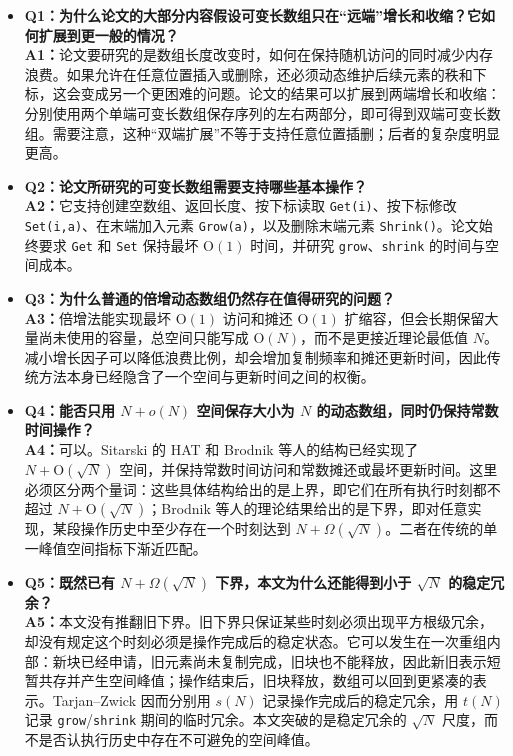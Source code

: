 \documentclass[UTF8,11pt,a4paper]{ctexart}
\newcommand{\op}[1]{\textnormal{\texttt{#1}}}
\newcommand{\Oh}{\mathrm{O}}
\begin{document}
\begin{itemize}[label={},leftmargin=0pt,itemsep=1.0em,topsep=0.5em]

  \item \textbf{Q1：为什么论文的大部分内容假设可变长数组只在“远端”增长和收缩？它如何扩展到更一般的情况？}
  \\
  \textbf{A1：}论文要研究的是数组长度改变时，如何在保持随机访问的同时减少内存浪费。如果允许在任意位置插入或删除，还必须动态维护后续元素的秩和下标，这会变成另一个更困难的问题。论文的结果可以扩展到两端增长和收缩：分别使用两个单端可变长数组保存序列的左右两部分，即可得到双端可变长数组。需要注意，这种“双端扩展”不等于支持任意位置插删；后者的复杂度明显更高。

  \item \textbf{Q2：论文所研究的可变长数组需要支持哪些基本操作？}
  \\
  \textbf{A2：}它支持创建空数组、返回长度、按下标读取 \op{Get(i)}、按下标修改 \op{Set(i,a)}、在末端加入元素 \op{Grow(a)}，以及删除末端元素 \op{Shrink()}。论文始终要求 \op{Get} 和 \op{Set} 保持最坏 $\Oh(1)$ 时间，并研究 \op{grow}、\op{shrink} 的时间与空间成本。

  \item \textbf{Q3：为什么普通的倍增动态数组仍然存在值得研究的问题？}
  \\
  \textbf{A3：}倍增法能实现最坏 $\Oh(1)$ 访问和摊还 $\Oh(1)$ 扩缩容，但会长期保留大量尚未使用的容量，总空间只能写成 $\Oh(N)$，而不是更接近理论最低值 $N$。减小增长因子可以降低浪费比例，却会增加复制频率和摊还更新时间，因此传统方法本身已经隐含了一个空间与更新时间之间的权衡。

  \item \textbf{Q4：能否只用 $N+o(N)$ 空间保存大小为 $N$ 的动态数组，同时仍保持常数时间操作？}
  \\
  \textbf{A4：}可以。Sitarski 的 HAT 和 Brodnik 等人的结构已经实现了 $N+\Oh(\sqrt{N})$ 空间，并保持常数时间访问和常数摊还或最坏更新时间。这里必须区分两个量词：这些具体结构给出的是上界，即它们在所有执行时刻都不超过 $N+\Oh(\sqrt{N})$；Brodnik 等人的理论结果给出的是下界，即对任意实现，某段操作历史中至少存在一个时刻达到 $N+\Omega(\sqrt{N})$。二者在传统的单一峰值空间指标下渐近匹配。

  \item \textbf{Q5：既然已有 $N+\Omega(\sqrt{N})$ 下界，本文为什么还能得到小于 $\sqrt{N}$ 的稳定冗余？}
  \\
  \textbf{A5：}本文没有推翻旧下界。旧下界只保证某些时刻必须出现平方根级冗余，却没有规定这个时刻必须是操作完成后的稳定状态。它可以发生在一次重组内部：新块已经申请，旧元素尚未复制完成，旧块也不能释放，因此新旧表示短暂共存并产生空间峰值；操作结束后，旧块释放，数组可以回到更紧凑的表示。Tarjan--Zwick 因而分别用 $s(N)$ 记录操作完成后的稳定冗余，用 $t(N)$ 记录 \op{grow}/\op{shrink} 期间的临时冗余。本文突破的是稳定冗余的 $\sqrt{N}$ 尺度，而不是否认执行历史中存在不可避免的空间峰值。


\end{itemize}
\end{document}
